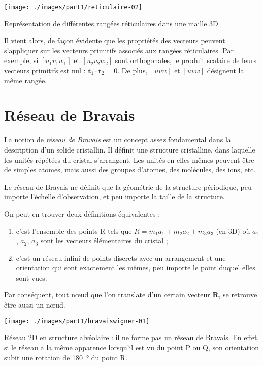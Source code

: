 \begin{marginfigure}
    \texttt{[image: ./images/part1/reticulaire-02]}
    \caption{Représentation de différentes rangées réticulaires dans une maille 3D}
    \label{fig:rangees3D}
\end{marginfigure}

Il vient alors, de façon évidente que les propriétés des vecteurs peuvent 
s'appliquer sur les vecteurs primitifs associés aux rangées réticulaires. Par
exemple, si $[u_1v_1w_1]$ et $[u_2v_2w_2]$ sont orthogonales, le produit 
scalaire de leurs vecteurs primitifs est nul :
$\mathbf{t}_1 \cdot \mathbf{t}_2 = 0$. De plus, $[uvw]$ et 
$[\bar{u}\bar{v}\bar{w}]$ désignent la même rangée.

\section{Réseau de Bravais}

La notion de \emph{réseau de Bravais} est un concept assez fondamental dans la
description d'un solide cristallin. Il définit une structure cristalline, dans
laquelle les unités répétées du cristal s'arrangent. Les unités en elles-mêmes
peuvent être de simples atomes, mais aussi des groupes d'atomes, des molécules, des ions, etc.

Le réseau de Bravais ne définit que la géométrie de la structure périodique,
peu importe l'échelle d'observation, et peu importe la taille de la structure.

On peut en trouver deux définitions équivalentes :
\begin{enumerate}
    \item \label{bravaisa} c'est l'ensemble des points R tels que
    $R = m_1 a_1 + m_2 a_2 + m_3 a_3$ (en 3D) où $a_1$, $a_2$, $a_3$ sont les
    vecteurs élémentaires du cristal ;
\item c'est un réseau infini de points discrets avec un arrangement et une
    orientation qui sont exactement les mêmes, peu importe le point duquel elles
     sont vues.
\end{enumerate}

Par conséquent, tout nœud que l'on translate d'un certain vecteur 
$\mathbf{R}$, se retrouve être aussi un nœud.

\begin{marginfigure}
    \texttt{[image: ./images/part1/bravaiswigner-01]}
    \caption{Réseau 2D en structure alvéolaire : il ne forme pas un réseau de Bravais. En effet, si le réseau a la même apparence lorsqu'il est vu du point P ou Q, son orientation subit une rotation de \SI{180}{\degree} du point R.}
    \label{fig:alveolaire}
\end{marginfigure}

